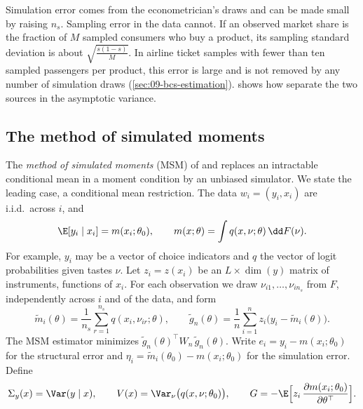 \begin{remark}\label{rem:A-sampling-error}
Simulation error comes from the econometrician's draws and can be made small by raising $n_s$. Sampling error in
the data cannot. If an observed market share is the fraction of $M$ sampled consumers who buy a product, its
sampling standard deviation is about $\sqrt{\frac{s(1 - s)}{M}}$. In airline ticket samples with fewer than ten sampled
passengers per product, this error is large and is not removed by any number of simulation draws
(\cref{sec:09-bcs-estimation}).  shows how \citet{BerryLevinsohnPakes1995} separate the
two sources in the asymptotic variance.
\end{remark}

\subsection{The method of simulated moments}\label{sec:A-msm}

The \emph{method of simulated moments} (MSM) of \citet{McFadden1989} and \citet{PakesPollard1989} replaces an
intractable conditional mean in a moment condition by an unbiased simulator. We state the leading case, a
conditional mean restriction. The data $w_i = (y_i, x_i)$ are i.i.d.\ across $i$, and
\begin{equation}\label{eq:A-msm-model}
  \E[y_i \mid x_i] = m(x_i;\theta_0), \qquad m(x;\theta) = \int q(x, \nu;\theta)\,\dd F(\nu).
\end{equation}
For example, $y_i$ may be a vector of choice indicators and $q$ the vector of logit probabilities given tastes
$\nu$. Let $z_i = z(x_i)$ be an $L \times \dim(y)$ matrix of instruments, functions of $x_i$. For each observation
we draw $\nu_{i1}, \dots, \nu_{in_s}$ from $F$, independently across $i$ and of the data, and form
\begin{equation}\label{eq:A-msm-sim}
  \tilde m_i(\theta) = \frac{1}{n_s}\sum_{r=1}^{n_s} q(x_i, \nu_{ir};\theta), \qquad
  \tilde g_n(\theta) = \frac{1}{n}\sum_{i=1}^{n} z_i\bigl(y_i - \tilde m_i(\theta)\bigr).
\end{equation}
The MSM estimator minimizes $\tilde g_n(\theta)^\top W_n\,\tilde g_n(\theta)$. Write $e_i = y_i - m(x_i;\theta_0)$
for the structural error and $\eta_i = \tilde m_i(\theta_0) - m(x_i;\theta_0)$ for the simulation error. Define
\begin{equation*}
  \Sigma_y(x) = \Var(y \mid x), \qquad V(x) = \Var_\nu\bigl(q(x, \nu;\theta_0)\bigr), \qquad
  G = -\E\Bigl[z_i\,\frac{\partial m(x_i;\theta_0)}{\partial\theta^\top}\Bigr].
\end{equation*}

